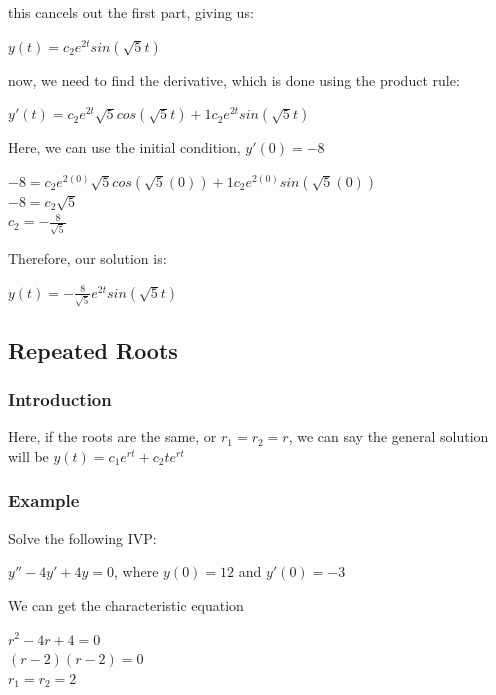 \documentclass{article}
\begin{document}
this cancels out the first part, giving us:

\begin{center}
    $y(t) = c_2 e^{2 t}sin(\sqrt{5} t)$
\end{center}

now, we need to find the derivative, which is done using the product rule:

\begin{center}
    $y'(t) = c_2 e^{2t} \sqrt{5}cos(\sqrt{5} t) + 1c_2 e^{2t} sin(\sqrt{5} t)$
\end{center}

Here, we can use the initial condition, $y'(0) = -8$

\begin{center}
    $-8 = c_2 e^{2(0)} \sqrt{5}cos(\sqrt{5} (0)) + 1c_2 e^{2(0)} sin(\sqrt{5} (0))$ \\
    $-8 = c_2\sqrt{5}$ \\
    $c_2 = -\frac{8}{\sqrt{5}}$
\end{center}

Therefore, our solution is:

\begin{center}
    $y(t) = -\frac{8}{\sqrt{5}} e^{2 t}sin(\sqrt{5} t)$
\end{center}

\subsection{Repeated Roots}
\subsubsection{Introduction}
Here, if the roots are the same, or $r_1 = r_2 = r$, we can say the general solution will be $y(t) = c_1 e^{rt} + c_2 te^{rt}$

\subsubsection{Example}

Solve the following IVP:

\begin{center}
    $y'' - 4y' + 4y = 0$, where $y(0) = 12$ and $y'(0) = -3$
\end{center}

We can get the characteristic equation

\begin{center}
    $r^2 - 4r + 4 = 0$ \\
    $(r - 2)(r - 2) = 0$ \\
    $r_1 = r_2 = 2$
\end{center}
\end{document}
